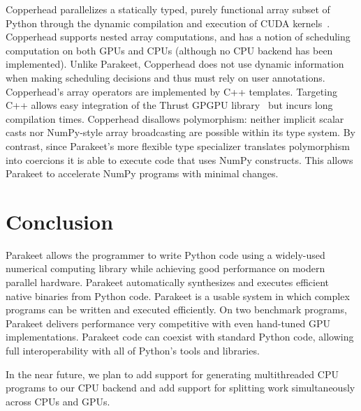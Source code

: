 \documentclass[10pt,twocolumn]{article}
\begin{document}
Copperhead parallelizes a statically typed, purely functional array subset of Python through the dynamic compilation and execution of CUDA kernels~\cite{Cata11}. Copperhead supports nested array computations, and has a notion of scheduling computation on both GPUs and CPUs (although no CPU backend has been implemented). Unlike Parakeet, Copperhead does not use dynamic information when making scheduling decisions and thus must rely on user annotations. Copperhead's array operators are implemented by C++ templates. Targeting C++ allows easy integration of the Thrust GPGPU library~\cite{Hobe10} but incurs long compilation times. Copperhead disallows polymorphism: neither implicit scalar casts nor NumPy-style array broadcasting are possible within its type system. By contrast, since Parakeet's more flexible type specializer translates polymorphism into coercions it is able to execute code that uses NumPy constructs. This allows Parakeet to accelerate NumPy programs with minimal changes.

\section{Conclusion}
\label{Conclusion}
Parakeet allows the programmer to write Python code using a widely-used numerical computing library while achieving good performance on modern parallel hardware. Parakeet automatically synthesizes and executes efficient native binaries from Python code. Parakeet is a usable system in which complex programs can be written and executed efficiently.  On two benchmark programs, Parakeet delivers performance very competitive with even hand-tuned GPU implementations.  Parakeet code can coexist with standard Python code, allowing full interoperability with all of Python's tools and libraries.

In the near future, we plan to add support for generating multithreaded CPU programs to our CPU backend and add support for splitting work simultaneously across CPUs and GPUs.

{\small

{}
}
\end{document}
